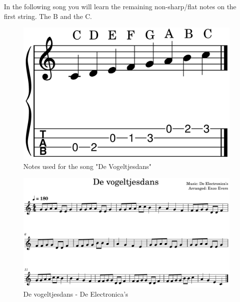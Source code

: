 In the following song you will learn the remaining non-sharp/flat notes on the first string. The B and the C.

\begin{figure}[h]
	\centering
	\includegraphics[height=0.12\textheight]{../../MuseScore/Ukulele/UkuleleNotesUsedInVogeltjesdans.png}
	\caption{Notes used for the song "De Vogeltjesdans"}
	\label{fig:ukulele_notes_for_vogeltjesdans}
\end{figure}


\begin{figure}[h]
	\centering
	\includegraphics[width=\textwidth]{../../MuseScore/Ukulele/UkuleleVogeltjesdansDeElectronicas.png}
	\caption{De vogeltjesdans - De Electronica's}
	\label{fig:ukulele_vogeltjesdans}
\end{figure}


